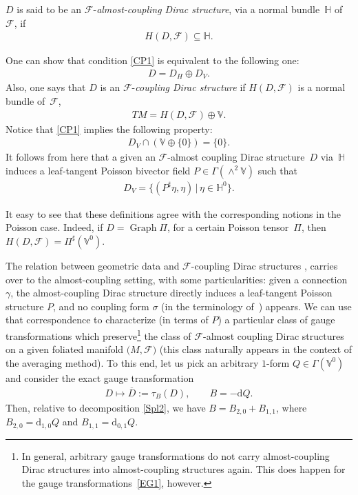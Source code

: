 \documentclass[10pt,a4paper]{amsart}
\numberwithin{equation}{section}
\begin{document}
\begin{Definition}
$D$ is said to be an $\mathcal{F}$-\emph{almost-coupling Dirac structure}, via a normal bundle~$\mathbb{H}$ of~$\mathcal{F}$, if \begin{gather}\label{CP1}
H(D,\mathcal{F})\subseteq\mathbb{H}.
\end{gather}
\end{Definition}

One can show that condition \eqref{CP1} is equivalent to the following one:
\begin{gather*}%
D=D_{H}\oplus D_{V}.
\end{gather*}
Also, one says that $D$ is an $\mathcal{F}$-\emph{coupling Dirac structure} \cite{Va-06,Wa} if $H(D,\mathcal{F})$ is a normal bundle of~$\mathcal{F}$,
\begin{gather*}
TM=H(D,\mathcal{F})\oplus\mathbb{V}.
\end{gather*}
Notice that \eqref{CP1} implies the following property:
\begin{gather*}
D_{V}\cap(\mathbb{V}\oplus\{0\})=\{0\}.
\end{gather*}
It follows from here that a given an $\mathcal{F}$-almost coupling Dirac structure~$D$ via~$\mathbb{H}$ induces a leaf-tangent Poisson bivector f\/ield $P\in\Gamma(\wedge^{2}\mathbb{V})$ such that
\begin{gather}
D_{V}=\big\{(P^{\sharp}\eta,\eta)\,|\,\eta\in\mathbb{H}^{0}\big\}.\label{NEW}
\end{gather}
\begin{Remark}
It easy to see that these def\/initions agree with the corresponding notions in the Poisson case. Indeed, if $D=\operatorname*{Graph}\Pi$, for a certain Poisson tensor~$\Pi$, then $H(D,\mathcal{F})=\Pi^{\sharp}(\mathbb{V}^{0})$.
\end{Remark}

The relation between geometric data and $\mathcal{F}$-coupling Dirac structures \cite{Va-06,JVYV-14,Wa}, carries over to the almost-coupling setting, with some particularities: given a connection~$\gamma$, the almost-coupling Dirac structure directly induces a leaf-tangent Poisson structure $P$, and no coupling form $\sigma$ (in the terminology of~\cite{JVYV-14}) appears. We can use that correspondence to characterize (in terms of $P$) a particular class of gauge transformations which preserve\footnote{In general, arbitrary gauge transformations do not carry almost-coupling Dirac
structures into almost-coupling structures again. This does happen for the gauge transformations~\eqref{EG1}, however.} the class of $\mathcal{F}$-almost coupling Dirac structures on a given foliated manifold $(M,\mathcal{F)}$ (this class naturally appears in the context of the
averaging method). To this end, let us pick an arbitrary $1$-form $Q\in\Gamma(\mathbb{V}^{0})$ and consider the exact gauge transformation
\begin{gather}\label{EG1}
D\mapsto\overline{D}:=\tau_{B}(D),\qquad B=-\mathrm{d}Q.
\end{gather}
Then, relative to decomposition \eqref{Spl2}, we have $B=B_{2,0}+B_{1,1}$, where $B_{2,0}=\mathrm{d}_{1,0}Q$ and $B_{1,1}=\mathrm{d}_{0,1}Q$.
\end{document}
